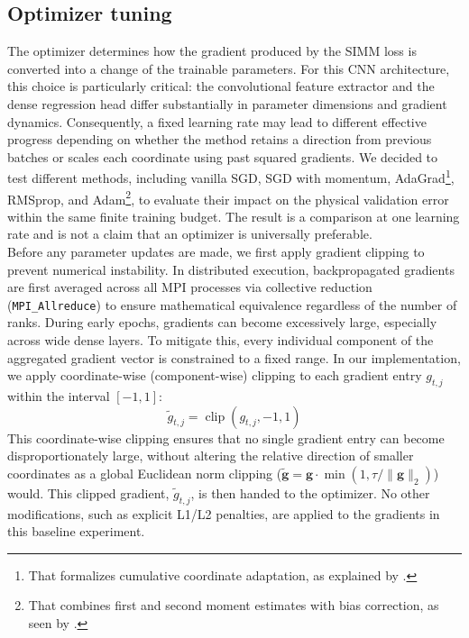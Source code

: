 \subsection{Optimizer tuning}
\label{sec:04_optimizer_tuning}

The optimizer determines how the gradient produced by the SIMM loss is converted into a change of the trainable parameters. For this CNN architecture, this choice is particularly critical: the convolutional feature extractor and the dense regression head differ substantially in parameter dimensions and gradient dynamics. Consequently, a fixed learning rate may lead to different effective progress depending on whether the method retains a direction from previous batches or scales each coordinate using past squared gradients. We decided to test different methods, including vanilla SGD, SGD with momentum, AdaGrad\footnote{That formalizes cumulative coordinate adaptation, as explained by \cite{duchi2011adaptive}.}, RMSprop, and Adam\footnote{That combines first and second moment estimates with bias correction, as seen by \cite{kingma2015adam}.}, to evaluate their impact on the physical validation error within the same finite training budget. The result is a comparison at one learning rate and is not a claim that an optimizer is universally preferable.\\

Before any parameter updates are made, we first apply gradient clipping to prevent numerical instability. In distributed execution, backpropagated gradients are first averaged across all MPI processes via collective reduction (\texttt{MPI\_Allreduce}) to ensure mathematical equivalence regardless of the number of ranks. During early epochs, gradients can become excessively large, especially across wide dense layers. To mitigate this, every individual component of the aggregated gradient vector is constrained to a fixed range. In our implementation, we apply coordinate-wise (component-wise) clipping to each gradient entry $g_{t,j}$ within the interval $[-1,1]$:
\begin{equation}
    \tilde{g}_{t,j}=\operatorname{clip}(g_{t,j},-1,1)
    \label{eq:04_optimizer_clipping}
\end{equation}
This coordinate-wise clipping ensures that no single gradient entry can become disproportionately large, without altering the relative direction of smaller coordinates as a global Euclidean norm clipping ($\tilde{\mathbf{g}}=\mathbf{g}\cdot\min(1,\tau/\lVert\mathbf{g}\rVert_2)$) would. This clipped gradient, $\tilde{g}_{t,j}$, is then handed to the optimizer. No other modifications, such as explicit L1/L2 penalties, are applied to the gradients in this baseline experiment.\\

